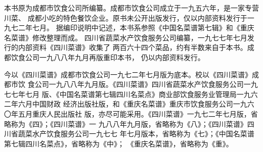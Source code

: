 %
%
%
%
%
%
%

\begingroup%
\small%
\begin{center}%
{%
	\Large\rmfamily\bfseries%
}%
\end{center}%

\vspace{.5\baselineskip}

本书原为成都市饮食公司所编纂。成都市饮食公司成立于一九五六年，是一家专营川菜、
成都小吃的特色餐饮企业。原书未公开出版发行，仅以内部资料发行于一九七二年七月。
据编印说明中记述，本书系参照《中国名菜谱第七辑》和《重庆名菜谱》修改整理而成。
四川省蔬菜水产饮食服务公司编纂，一九七七年七月发行的内部资料《四川菜谱》收集了
两百六十四个菜品，约有半数来自于本书。成都饮食公司一九八八年九月再版重印本书，
仍以内部资料发行。

今以《四川菜谱》成都市饮食公司一九七二年七月版为底本。校以《四川菜谱》成都市饮
食公司一九八八年九月版。《四川菜谱》四川省蔬菜水产饮食服务公司一九七七年七月
版、《中国名菜谱第七辑四川名菜点》商业部饮食服务业管理局一九六二年六月中国财政
经济出版社版，和《重庆名菜谱》重庆市饮食服务公司一九六〇年五月重庆人民出版社
版，亦尽可能采用。《四川菜谱》一九七二年七月版，省略称为《四》；《四川菜谱》一
九八八年九月版，省略称为《八》；《四川菜谱》四川省蔬菜水产饮食服务公司一九七七
年七月版本，省略称为《七》；《中国名菜谱第七辑四川名菜点》，省略称为《中》；
《重庆名菜谱》，省略称为《重》。

